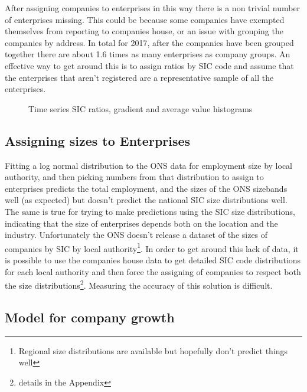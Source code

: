 \documentclass[a4paper,10pt]{article}
\begin{document}
After assigning companies to enterprises in this way there is a non trivial number of enterprises missing. This could be because some companies have exempted themselves from reporting to companies house, or an issue with grouping the companies by address. In total for 2017, after the companies have been grouped together there are about 1.6 times as many enterprises as company groups. An effective way to get around this is to assign ratios by SIC code and assume that the enterprises that aren't registered are a representative sample of all the enterprises.
\begin{figure}[!ht]
 \caption{Time series SIC ratios, gradient and average value histograms}
\end{figure}


\subsection{Assigning sizes to Enterprises}
\label{enterprise_sizes}
Fitting a log normal distribution to the ONS data for employment size by local authority, and then picking numbers from that distribution to assign to enterprises predicts the total employment, and the sizes of the ONS sizebands well (as expected) but doesn't predict the national SIC size distributions well. The same is true for trying to make predictions using the SIC size distributions, indicating that the size of enterprises depends both on the location and the industry. Unfortunately the ONS doesn't release a dataset of the sizes of companies by SIC by local authority\footnote{Regional size distributions are available but hopefully don't predict things well}. In order to get around this lack of data, it is possible to use the companies house data to get detailed SIC code distributions for each local authority and then force the assigning of companies to respect both the size distributions\footnote{details in the Appendix}. Measuring the accuracy of this solution is difficult.
\subsection{Model for company growth}
\end{document}
